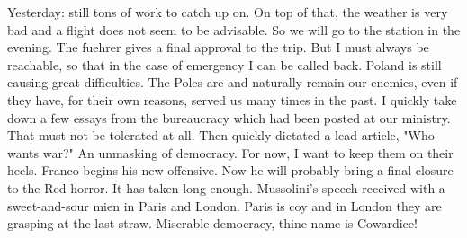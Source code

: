 Yesterday: still tons of work to catch up on. On top of that, the weather is very bad and a flight does not seem to be advisable. So we will go to the station in the evening. The fuehrer gives a final approval to the trip.  But I must always be reachable, so that in the case of emergency I can be called back. Poland is still causing great difficulties. The Poles are and naturally remain our enemies, even if they have, for their own reasons, served us many times in the past. I quickly take down a few essays from the bureaucracy which had been posted at our ministry. That must not be tolerated at all. Then quickly dictated a lead article, "Who wants war?" An unmasking of democracy. For now, I want to keep them on their heels. Franco begins his new offensive. Now he will probably bring a final closure to the Red horror. It has taken long enough. Mussolini's speech received with a sweet-and-sour mien in Paris and London.  Paris is coy and in London they are grasping at the last straw. Miserable democracy, thine name is Cowardice!
